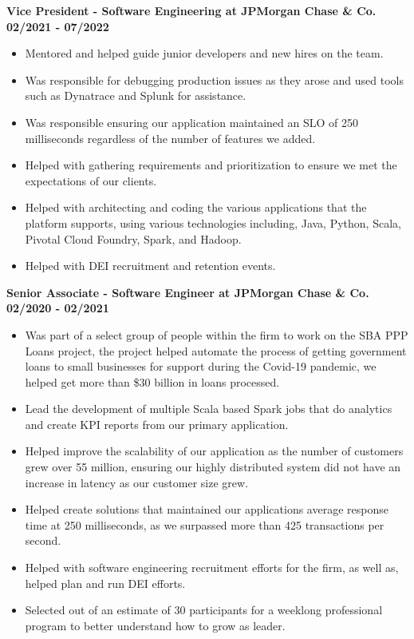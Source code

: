 \documentclass{res}
\begin{document}
\begin{resume}
	\textbf{Vice President - Software Engineering at JPMorgan Chase \& Co.}
	\hfill{\bf 02/2021 - 07/2022}
	\begin{itemize}
		\item Mentored and helped guide junior developers and new hires on the team.
		\item Was responsible for debugging production issues as they arose and used tools such as Dynatrace and Splunk for
assistance.
		\item Was responsible ensuring our application maintained an SLO of 250 milliseconds regardless of the number of features we added.
		\item Helped with gathering requirements and prioritization to ensure we met the expectations of our clients.
		\item Helped with architecting and coding the various applications that the platform supports, using various technologies
including, Java, Python, Scala, Pivotal Cloud Foundry, Spark, and Hadoop.		
		\item Helped with DEI recruitment and retention events.
	\end{itemize}
	
	\textbf{Senior Associate - Software Engineer at JPMorgan Chase \& Co.}
	\hfill{\bf 02/2020 - 02/2021}
	\begin{itemize}
		\item Was part of a select group of people within the firm to work on the SBA PPP Loans project, the project helped automate the process of getting government loans to small businesses for support during the Covid-19
pandemic, we helped get more than \$30 billion in loans processed.
		\item Lead the development of multiple Scala based Spark jobs that do analytics and create KPI reports from our
primary application.
		\item Helped improve the scalability of our application as the number of customers grew over 55 million, ensuring our highly distributed system did not have an increase in latency as our customer size grew.
		\item Helped create solutions that maintained our applications average response time at 250 milliseconds, as we surpassed more than 425 transactions per second.
		\item Helped with software engineering recruitment efforts for the firm, as well as, helped plan and run DEI efforts.
		\item Selected out of an estimate of 30 participants for a weeklong professional program to better understand how to grow
as leader.
	\end{itemize}


\end{resume}
\end{document}
